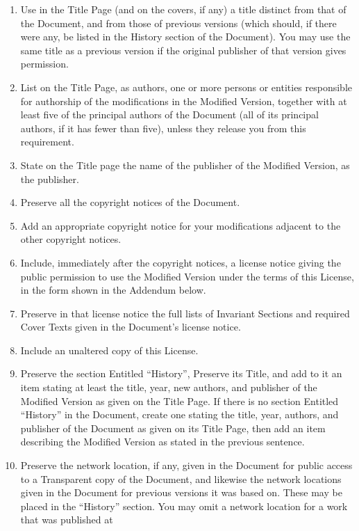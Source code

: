 \documentclass[10pt,a4paper,titlepage,twoside,openright]{report}
\begin{document}
\begin{enumerate}
\item Use in the Title Page (and on the covers, if any) a title distinct
   from that of the Document, and from those of previous versions
   (which should, if there were any, be listed in the History section
   of the Document).  You may use the same title as a previous version
   if the original publisher of that version gives permission.
\item List on the Title Page, as authors, one or more persons or entities
   responsible for authorship of the modifications in the Modified
   Version, together with at least five of the principal authors of the
   Document (all of its principal authors, if it has fewer than five),
   unless they release you from this requirement.
\item State on the Title page the name of the publisher of the
   Modified Version, as the publisher.
\item Preserve all the copyright notices of the Document.
\item Add an appropriate copyright notice for your modifications
   adjacent to the other copyright notices.
\item Include, immediately after the copyright notices, a license notice
   giving the public permission to use the Modified Version under the
   terms of this License, in the form shown in the Addendum below.
\item Preserve in that license notice the full lists of Invariant Sections
   and required Cover Texts given in the Document's license notice.
\item Include an unaltered copy of this License.
\item Preserve the section Entitled ``History'', Preserve its Title, and add
   to it an item stating at least the title, year, new authors, and
   publisher of the Modified Version as given on the Title Page.  If
   there is no section Entitled ``History'' in the Document, create one
   stating the title, year, authors, and publisher of the Document as
   given on its Title Page, then add an item describing the Modified
   Version as stated in the previous sentence.
\item Preserve the network location, if any, given in the Document for
   public access to a Transparent copy of the Document, and likewise
   the network locations given in the Document for previous versions
   it was based on.  These may be placed in the ``History'' section.
   You may omit a network location for a work that was published at

\end{enumerate}
\end{document}
